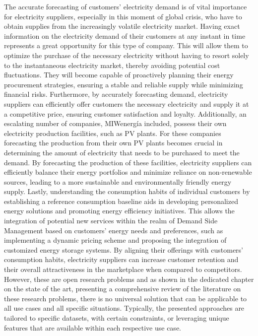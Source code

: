The accurate forecasting of customers' electricity demand is of vital importance for electricity suppliers, especially in this moment of global crisis, who have to obtain supplies from the increasingly volatile electricity market.
Having exact information on the electricity demand of their customers at any instant in time represents a great opportunity for this type of company.
This will allow them to optimize the purchase of the necessary electricity without having to resort solely to the instantaneous electricity market, thereby avoiding potential cost fluctuations.
They will become capable of proactively planning their energy procurement strategies, ensuring a stable and reliable supply while minimizing financial risks.
Furthermore, by accurately forecasting demand, electricity suppliers can efficiently offer customers the necessary electricity and supply it at a competitive price, ensuring customer satisfaction and loyalty.
Additionally, an escalating number of companies, MIWenergía included, possess their own electricity production facilities, such as PV plants.
For these companies forecasting the production from their own PV plants becomes crucial in determining the amount of electricity that needs to be purchased to meet the demand.
By forecasting the production of these facilities, electricity suppliers can efficiently balance their energy portfolios and minimize reliance on non-renewable sources, leading to a more sustainable and environmentally friendly energy supply.
Lastly, understanding the consumption habits of individual customers by establishing a reference consumption baseline aids in developing personalized energy solutions and promoting energy efficiency initiatives.
This allows the integration of potential new services within the realm of Demand Side Management based on customers' energy needs and preferences, such as implementing a dynamic pricing scheme and proposing the integration of customized energy storage systems.
By aligning their offerings with customers' consumption habits, electricity suppliers can increase customer retention and their overall attractiveness in the marketplace when compared to competitors.
However, these are open research problems and as shown in the dedicated chapter on the state of the art, presenting a comprehensive review of the literature on these research problems, there is no universal solution that can be applicable to all use cases and all specific situations.
Typically, the presented approaches are tailored to specific datasets, with certain constraints, or leveraging unique features that are available within each respective use case.

